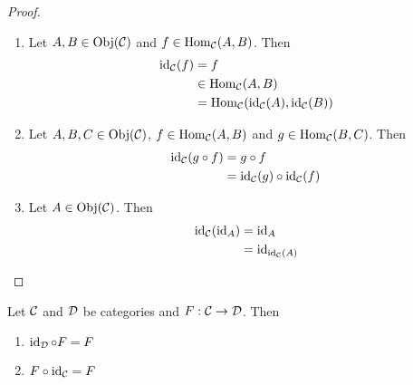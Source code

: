 \documentclass{book}
\begin{document}
	\begin{proof}\
		\begin{enumerate}
			\item Let $A, B \in \Obj(\MC)$ and $f \in \Hom_{\MC}(A,B)$. Then 
			\begin{align*}
				\id_{\MC}(f) 
				& = f \\
				& \in \Hom_{\MC}(A, B) \\
				& = \Hom_{\MC}(\id_{\MC}(A), \id_{\MC}(B)) \\
			\end{align*}
			\item Let $A,B, C \in \Obj(\MC)$, $f \in \Hom_{\MC}(A,B)$ and $g \in \Hom_{\MC}(B, C)$. Then 
			\begin{align*}
				\id_{\MC}(g \circ f) 
				& = g \circ f \\
				& = \id_{\MC}(g) \circ \id_{\MC} (f)
			\end{align*}
			\item Let $A \in \Obj(\MC)$. Then 
			\begin{align*}
				\id_{\MC}(\id_{A})
				& = \id_A \\
				& = \id_{\id_{\MC}(A)}
			\end{align*}
		\end{enumerate}
	\end{proof}

	\begin{ex} 
		Let $\MC$ and $\MD$ be categories and $F:\MC \rightarrow \MD$. Then 
		\begin{enumerate}
			\item $\id_{\MD} \circ F = F$
			\item $F \circ \id_{\MC} = F$
		\end{enumerate}
	\end{ex}
\end{document}

